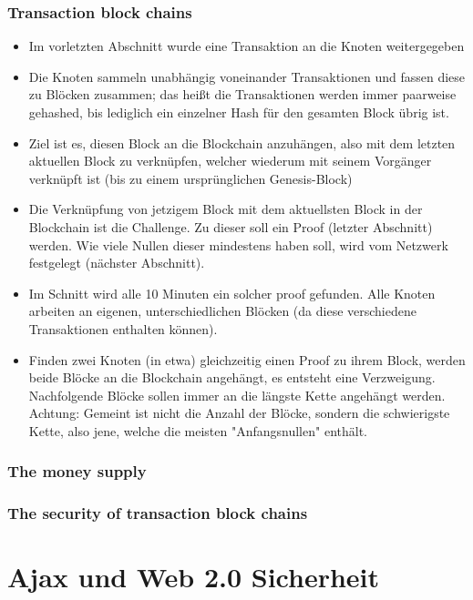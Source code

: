\documentclass{article} %
\begin{document}
	\subsubsection{Transaction block chains}
	\begin{itemize}
		\item Im vorletzten Abschnitt wurde eine Transaktion an die Knoten weitergegeben
		\item Die Knoten sammeln unabhängig voneinander Transaktionen und fassen diese zu Blöcken zusammen; das heißt die Transaktionen werden immer paarweise gehashed, bis lediglich ein einzelner Hash für den gesamten Block übrig ist.
		\item Ziel ist es, diesen Block an die Blockchain anzuhängen, also mit dem letzten aktuellen Block zu verknüpfen, welcher wiederum mit seinem Vorgänger verknüpft ist (bis zu einem ursprünglichen Genesis-Block)
		\item Die Verknüpfung von jetzigem Block mit dem aktuellsten Block in der Blockchain ist die Challenge. 
		Zu dieser soll ein Proof (letzter Abschnitt) werden.
		Wie viele Nullen dieser mindestens haben soll, wird vom Netzwerk festgelegt (nächster Abschnitt).
		\item Im Schnitt wird alle 10 Minuten ein solcher proof gefunden.
		Alle Knoten arbeiten an eigenen, unterschiedlichen Blöcken (da diese verschiedene Transaktionen enthalten können).
		\item Finden zwei Knoten (in etwa) gleichzeitig einen Proof zu ihrem Block, werden beide Blöcke an die Blockchain angehängt, es entsteht eine Verzweigung.
		Nachfolgende Blöcke sollen immer an die längste Kette angehängt werden.
		Achtung: Gemeint ist nicht die Anzahl der Blöcke, sondern die schwierigste Kette, also jene, welche die meisten "Anfangsnullen" enthält.
	\end{itemize}
	\subsubsection{The money supply}
	\subsubsection{The security of transaction block chains}
	
	
	
	\section{Ajax und Web 2.0 Sicherheit}
\end{document}
